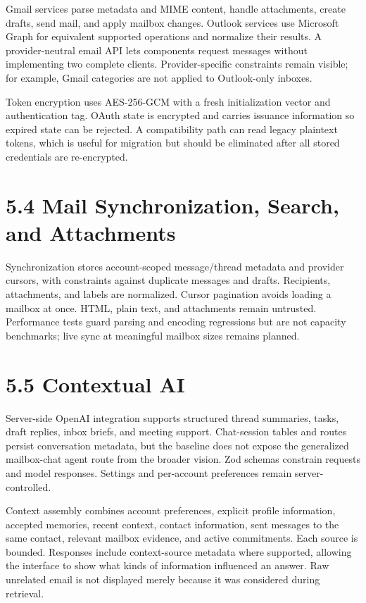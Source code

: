 \documentclass[
]{report}
\begin{document}
Gmail services parse metadata and MIME content, handle attachments,
create drafts, send mail, and apply mailbox changes. Outlook services
use Microsoft Graph for equivalent supported operations and normalize
their results. A provider-neutral email API lets components request
messages without implementing two complete clients. Provider-specific
constraints remain visible; for example, Gmail categories are not
applied to Outlook-only inboxes.

Token encryption uses AES-256-GCM with a fresh initialization vector and
authentication tag. OAuth state is encrypted and carries issuance
information so expired state can be rejected. A compatibility path can
read legacy plaintext tokens, which is useful for migration but should
be eliminated after all stored credentials are re-encrypted.

\section{5.4 Mail Synchronization, Search, and
Attachments}\label{54-mail-synchronization-search-and-attachments}

Synchronization stores account-scoped message/thread metadata and
provider cursors, with constraints against duplicate messages and
drafts. Recipients, attachments, and labels are normalized. Cursor
pagination avoids loading a mailbox at once. HTML, plain text, and
attachments remain untrusted. Performance tests guard parsing and
encoding regressions but are not capacity benchmarks; live sync at
meaningful mailbox sizes remains planned.

\section{5.5 Contextual AI}\label{55-contextual-ai}

Server-side OpenAI integration supports structured thread summaries,
tasks, draft replies, inbox briefs, and meeting support. Chat-session
tables and routes persist conversation metadata, but the baseline does
not expose the generalized mailbox-chat agent route from the broader
vision. Zod schemas constrain requests and model responses. Settings and
per-account preferences remain server-controlled.

Context assembly combines account preferences, explicit profile
information, accepted memories, recent context, contact information,
sent messages to the same contact, relevant mailbox evidence, and active
commitments. Each source is bounded. Responses include context-source
metadata where supported, allowing the interface to show what kinds of
information influenced an answer. Raw unrelated email is not displayed
merely because it was considered during retrieval.
\end{document}
